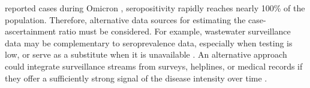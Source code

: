 reported cases during Omicron \citep{ruff2022rapid, nyreinfect2021,
hireinfect2022, wareinfect2022}, seropositivity rapidly reaches nearly 100\% of
the population. Therefore, alternative data sources for estimating the
case-ascertainment ratio must be considered. For example, wastewater
surveillance data may be complementary to seroprevalence data, especially when
testing is low, or serve as a substitute when it is unavailable
\citep{mcmanus2023predicting}. %
An alternative approach could integrate surveillance streams from
surveys, helplines, or medical records if they
offer a sufficiently strong signal of the disease intensity over time
\citep{reinhart2021open,ecdc2020strategies}.



